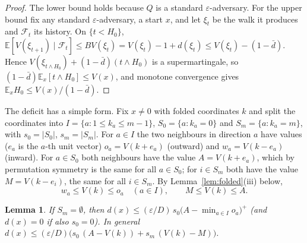 \documentclass[11pt]{amsart}
\newtheorem{lemma}[theorem]{Lemma}
\theoremstyle{remark}
\newcommand{\eps}{\varepsilon}
\newcommand{\E}{\mathbb{E}}
\begin{document}
\begin{proof}
The lower bound holds because $Q$ is a standard $\eps$-adversary. For the upper bound fix any standard
$\eps$-adversary, a start $x$, and let $\xi_t$ be the walk it produces and $\mathcal F_t$ its history. On $\{t<H_0\}$,
$\E[V(\xi_{t+1})\mid\mathcal F_t]\le BV(\xi_t)=V(\xi_t)-1+d(\xi_t)\le V(\xi_t)-(1-\bar d)$. Hence
$V(\xi_{t\wedge H_0})+(1-\bar d)(t\wedge H_0)$ is a supermartingale, so $(1-\bar d)\E_x[t\wedge H_0]\le V(x)$, and
monotone convergence gives $\E_xH_0\le V(x)/(1-\bar d)$.
\end{proof}

The deficit has a simple form. Fix $x\ne0$ with folded coordinates $k$ and split the coordinates into
$I=\{a:1\le k_a\le m-1\}$, $S_0=\{a:k_a=0\}$ and $S_m=\{a:k_a=m\}$, with $s_0=|S_0|$, $s_m=|S_m|$. For $a\in I$ the
two neighbours in direction $a$ have values ($e_a$ is the $a$-th unit vector) $o_a=V(k+e_a)$ (outward) and $w_a=V(k-e_a)$ (inward). For $a\in S_0$ both
neighbours have the value $A=V(k+e_a)$, which by permutation symmetry is the same for all $a\in S_0$; for $i\in S_m$
both have the value $M=V(k-e_i)$, the same for all $i\in S_m$. By Lemma~\ref{lem:folded}(iii) below,
\begin{equation}\label{eq:order}
w_a\le V(k)\le o_a\quad(a\in I),\qquad M\le V(k)\le A.
\end{equation}

\begin{lemma}\label{lem:deficit}
If $S_m=\emptyset$, then $d(x)\le(\eps/D)\,s_0\bigl(A-\min_{a\in I}o_a\bigr)^+$ (and $d(x)=0$ if also $s_0=0$).
In general $d(x)\le(\eps/D)\bigl(s_0\,(A-V(k))+s_m\,(V(k)-M)\bigr)$.
\end{lemma}
\end{document}
